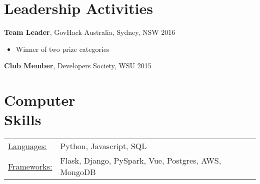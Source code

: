 \documentclass[margin]{res}
\begin{document}
\begin{resume}
\section{Leadership   Activities}
               {\bf Team Leader}, GovHack Australia, Sydney, NSW    \hfill        2016
                \begin{itemize} \itemsep -2pt
              	\item Winner of two prize categories 
		\end{itemize}

		{\bf Club Member}, Developers Society, WSU \hfill   2015

\section{Computer \\ Skills}
   \begin{tabular}{l p{3in}}
    \underline{Languages:} & Python, Javascript, SQL \\
	\underline{Frameworks:} &  Flask, Django, PySpark, Vue, Postgres, AWS, MongoDB \\
 \end{tabular}

\end{resume}
\end{document}
